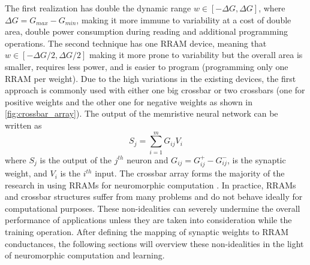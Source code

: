 \documentclass[english]{article}
\renewcommand{\cite}{\citep}
\begin{document}
The first realization has double the dynamic range $w\in [-\Delta G, \Delta G]$, where $\Delta G=G_{max}-G_{min}$, making it more immune to variability at a cost of double area, double power consumption during reading and additional programming operations. 
The second technique has one RRAM device, meaning that $w\in [-\Delta G/2, \Delta G/2]$ making it more prone to variability but the overall area is smaller, requires less power, and is easier to program (programming only one RRAM per weight).  
Due to the high variations in the existing devices, the first approach is commonly used with either one big crossbar or two crossbars (one for positive weights and the other one for negative weights as shown in \ref{fig:crossbar_array}). 
The output of the memristive neural network can be written as
%
\begin{equation}
    S_j=\sum_{i=1}^m G_{ij} V_i
\end{equation}
\noindent where $S_j$ is the output of the $j^{th}$ neuron and $G_{ij}=G_{ij}^{+} - G_{ij}^{-}$, is the synaptic weight, and $V_i$ is the $i^{th}$ input. 
%
The crossbar array forms the majority of the research in using RRAMs for neuromorphic computation \cite{yu2018neuro}.
In practice, RRAMs and crossbar structures suffer from many problems and do not behave ideally for computational purposes.
These non-idealities can severely undermine the overall performance of applications unless they are taken into consideration while the training operation. 
After defining the mapping of synaptic weights to RRAM conductances, the following sections will overview these non-idealities in the light of neuromorphic computation and learning.
\end{document}
